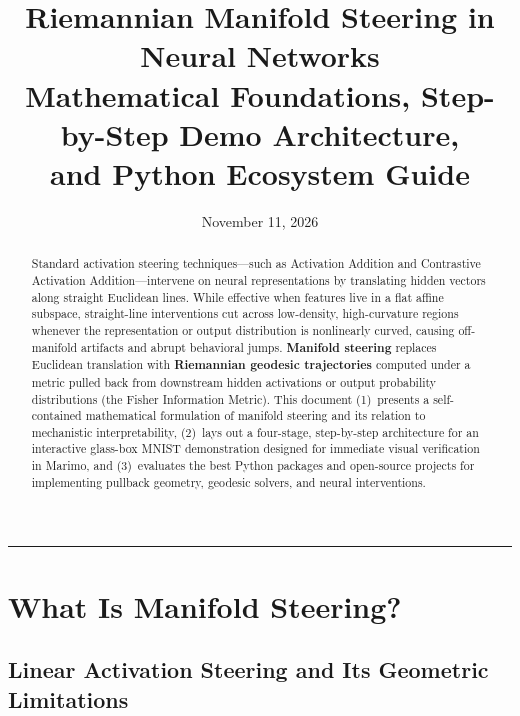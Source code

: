 \documentclass[11pt,a4paper]{article}
\title{\textbf{Riemannian Manifold Steering in Neural Networks}\\[0.4em]
\large Mathematical Foundations, Step-by-Step Demo Architecture,\\and Python Ecosystem Guide}
\author{}
\date{November 11, 2026}
\theoremstyle{definition}
\begin{document}
\maketitle

\begin{abstract}
\noindent
Standard activation steering techniques---such as Activation Addition and Contrastive Activation Addition---intervene on neural representations by translating hidden vectors along straight Euclidean lines. While effective when features live in a flat affine subspace, straight-line interventions cut across low-density, high-curvature regions whenever the representation or output distribution is nonlinearly curved, causing off-manifold artifacts and abrupt behavioral jumps. \textbf{Manifold steering} replaces Euclidean translation with \textbf{Riemannian geodesic trajectories} computed under a metric pulled back from downstream hidden activations or output probability distributions (the Fisher Information Metric). This document (1)~presents a self-contained mathematical formulation of manifold steering and its relation to mechanistic interpretability, (2)~lays out a four-stage, step-by-step architecture for an interactive glass-box MNIST demonstration designed for immediate visual verification in Marimo, and (3)~evaluates the best Python packages and open-source projects for implementing pullback geometry, geodesic solvers, and neural interventions.
\end{abstract}

\tableofcontents

\vspace{0.75em}
\hrule
\vspace{0.75em}

\section{What Is Manifold Steering?}
\label{sec:what-is-manifold-steering}

\subsection{Linear Activation Steering and Its Geometric Limitations}
\end{document}
